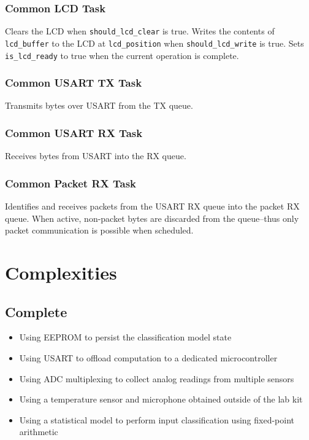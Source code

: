 \documentclass{article}
\begin{document}
\subsubsection{Common LCD Task}


Clears the LCD when \verb#should_lcd_clear# is true.  Writes the
contents of \verb#lcd_buffer# to the LCD at \verb#lcd_position# when
\verb#should_lcd_write# is true.  Sets \verb#is_lcd_ready# to true when
the current operation is complete.

\subsubsection{Common USART TX Task}


Transmits bytes over USART from the TX queue.

\subsubsection{Common USART RX Task}


Receives bytes from USART into the RX queue.

\subsubsection{Common Packet RX Task}


Identifies and receives packets from the USART RX queue into the packet
RX queue.  When active, non-packet bytes are discarded from the
queue--thus only packet communication is possible when scheduled.

\section{Complexities}

\subsection{Complete}

\begin{itemize}

  \item Using EEPROM to persist the classification model state

  \item Using USART to offload computation to a dedicated
    microcontroller

  \item Using ADC multiplexing to collect analog readings from multiple
    sensors

  \item Using a temperature sensor and microphone obtained outside of
    the lab kit

  \item Using a statistical model to perform input classification using
    fixed-point arithmetic

\end{itemize}
\end{document}
